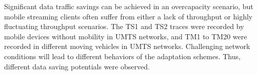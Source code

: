 Significant data traffic savings can be achieved in an overcapacity scenario, but mobile streaming clients often suffer from either a lack of throughput or highly fluctuating throughput scenarios.
The TS1 and TS2 traces were recorded by mobile devices without mobility in \ac{UMTS} networks, and TM1 to TM20 were recorded in different moving vehicles in \ac{UMTS} networks.
Challenging network conditions will lead to different behaviors of the adaptation schemes. 
Thus, different data saving potentials were observed.

\begin{figure}[!htb]
 \centering                 
 \\

\end{figure}

